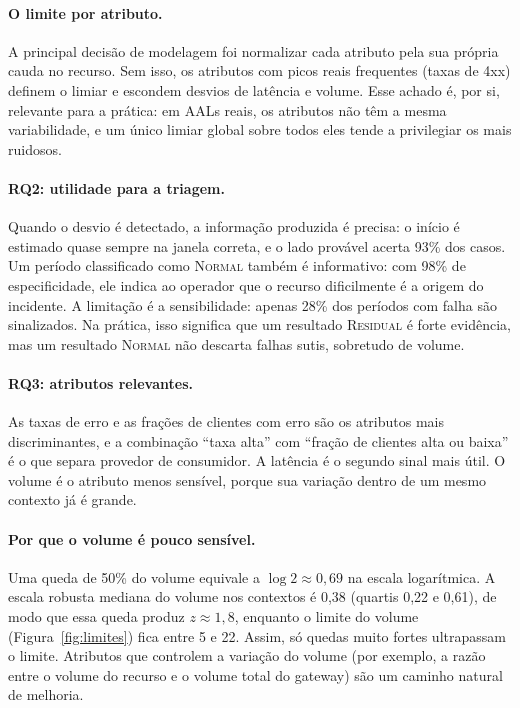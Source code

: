 \documentclass[sigconf,nonacm]{acmart}
\newcommand{\Normal}{\textsc{Normal}\xspace}
\newcommand{\Residual}{\textsc{Residual}\xspace}
\begin{document}
\paragraph{O limite por atributo.} A principal decisão de modelagem foi normalizar cada atributo pela sua própria cauda no recurso. Sem isso, os atributos com picos reais frequentes (taxas de 4xx) definem o limiar e escondem desvios de latência e volume. Esse achado é, por si, relevante para a prática: em AALs reais, os atributos não têm a mesma variabilidade, e um único limiar global sobre todos eles tende a privilegiar os mais ruidosos.

\paragraph{RQ2: utilidade para a triagem.} Quando o desvio é detectado, a informação produzida é precisa: o início é estimado quase sempre na janela correta, e o lado provável acerta 93\% dos casos. Um período classificado como \Normal também é informativo: com 98\% de especificidade, ele indica ao operador que o recurso dificilmente é a origem do incidente. A limitação é a sensibilidade: apenas 28\% dos períodos com falha são sinalizados. Na prática, isso significa que um resultado \Residual é forte evidência, mas um resultado \Normal não descarta falhas sutis, sobretudo de volume.

\paragraph{RQ3: atributos relevantes.} As taxas de erro e as frações de clientes com erro são os atributos mais discriminantes, e a combinação ``taxa alta'' com ``fração de clientes alta ou baixa'' é o que separa provedor de consumidor. A latência é o segundo sinal mais útil. O volume é o atributo menos sensível, porque sua variação dentro de um mesmo contexto já é grande.

\paragraph{Por que o volume é pouco sensível.} Uma queda de 50\% do volume equivale a $\log 2\approx0{,}69$ na escala logarítmica. A escala robusta mediana do volume nos contextos é 0,38 (quartis 0,22 e 0,61), de modo que essa queda produz $z\approx1{,}8$, enquanto o limite do volume (Figura~\ref{fig:limites}) fica entre 5 e 22. Assim, só quedas muito fortes ultrapassam o limite. Atributos que controlem a variação do volume (por exemplo, a razão entre o volume do recurso e o volume total do gateway) são um caminho natural de melhoria.
\end{document}

